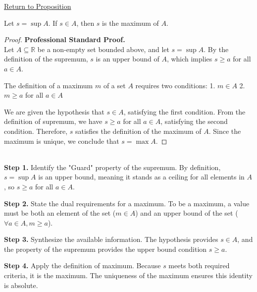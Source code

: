\newpage
{}
\label{prf:supremum-in-the-set-is-the-maximum}

\begin{remark*}[Return]
\hyperref[prop:supremum-in-the-set-is-the-maximum]{Return to Proposition}
\end{remark*}

\begin{theorem*}
Let $s = \sup A$. If $s \in A$, then $s$ is the maximum of $A$.
\end{theorem*}

\begin{proof}
\textbf{Professional Standard Proof.}~\\
Let $A \subseteq \mathbb{R}$ be a non-empty set bounded above, and let $s = \sup A$. By the definition of the supremum, $s$ is an upper bound of $A$, which implies $s \ge a$ for all $a \in A$. 

The definition of a maximum $m$ of a set $A$ requires two conditions:
1. $m \in A$
2. $m \ge a$ for all $a \in A$

We are given the hypothesis that $s \in A$, satisfying the first condition. From the definition of supremum, we have $s \ge a$ for all $a \in A$, satisfying the second condition. Therefore, $s$ satisfies the definition of the maximum of $A$. Since the maximum is unique, we conclude that $s = \max A$.
\end{proof}

\begin{remark*}~\\
\textbf{Step 1.} Identify the "Guard" property of the supremum. By definition, $s = \sup A$ is an upper bound, meaning it stands as a ceiling for all elements in $A$, so $s \ge a$ for all $a \in A$.

\textbf{Step 2.} State the dual requirements for a maximum. To be a maximum, a value must be both an element of the set ($m \in A$) and an upper bound of the set ($\forall a \in A, m \ge a$).

\textbf{Step 3.} Synthesize the available information. The hypothesis provides $s \in A$, and the property of the supremum provides the upper bound condition $s \ge a$.

\textbf{Step 4.} Apply the definition of maximum. Because $s$ meets both required criteria, it is the maximum. The uniqueness of the maximum ensures this identity is absolute.
\end{remark*}

